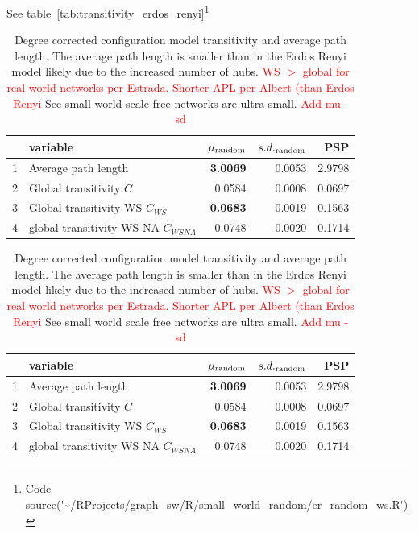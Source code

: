 See table~\ref{tab:transitivity_erdos_renyi}\footnote{Code \url{source('~/RProjects/graph_sw/R/small_world_random/er_random_ws.R')}}




\begin{table}[ht]
\centering
\begin{tabular}{rlrrr}
  \hline
 & variable & $\mu\textsubscript{random}$ & $s.d.\textsubscript{random}$ & PSP \\ 
  \hline
1 & Average path length & \textbf{3.0069} & 0.0053 & 2.9798 \\ 
  2 & Global transitivity $C$ & 0.0584 & 0.0008 & 0.0697 \\ 
  3 & Global transitivity WS $C_{WS}$ &\textbf{ 0.0683} & 0.0019 & 0.1563 \\ 
  4 & global transitivity WS NA $C_{WSNA}$ & 0.0748 & 0.0020 & 0.1714 \\ 
   \hline
\end{tabular}
\caption{Degree corrected configuration model transitivity and average path length. The average path length is smaller than in the Erdos Renyi model likely due to the increased number of hubs. \textcolor{red}{WS $>$ global for real world networks per Estrada. Shorter APL per Albert (than Erdos Renyi} See small world scale free networks are ultra small. \textcolor{red}{Add mu - sd}}
\label{tab:cmtransitivity_configuration_model}
\end{table}


\begin{table}[ht]
\centering
\begin{tabular}{rlrrr}
  \hline
 & variable & $\mu\textsubscript{random}$ & $s.d.\textsubscript{random}$ & PSP \\ 
  \hline
1 & Average path length & \textbf{3.0069} & 0.0053 & 2.9798 \\ 
  2 & Global transitivity $C$ & 0.0584 & 0.0008 & 0.0697 \\ 
  3 & Global transitivity WS $C_{WS}$ &\textbf{ 0.0683} & 0.0019 & 0.1563 \\ 
  4 & global transitivity WS NA $C_{WSNA}$ & 0.0748 & 0.0020 & 0.1714 \\ 
   \hline
\end{tabular}
\caption{Degree corrected configuration model transitivity and average path length. The average path length is smaller than in the Erdos Renyi model likely due to the increased number of hubs. \textcolor{red}{WS $>$ global for real world networks per Estrada. Shorter APL per Albert (than Erdos Renyi} See small world scale free networks are ultra small. \textcolor{red}{Add mu - sd}}
\label{tab:cmtransitivity_configuration_model}
\end{table}

